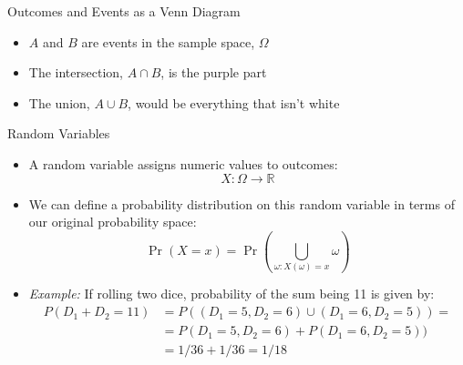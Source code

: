 \begin{frame}{Outcomes and Events as a Venn Diagram}


\def\firstcircle{(0,0) circle (1.5cm)}
\def\secondcircle{(0:2cm) circle (1.5cm)}

\begin{figure}
	\centering
{}
\end{figure}
\begin{itemize}
	\item $A$ and $B$ are events in the sample space, $\Omega$
	\item The intersection, $A\cap B$, is the purple part	
	\item The union, $A\cup B$, would be everything that isn't white
\end{itemize}


\end{frame}


\begin{frame}{Random Variables}
\begin{itemize}
	\item A random variable assigns numeric values to outcomes:\[
		X:\Omega \rightarrow \mathbb{R}
	\]

	\item We can define a probability distribution on this random variable in terms of our original probability space:	\[
				\Pr(X=x) = \Pr\left(\bigcup_{\omega:X(\omega)=x} \omega\right)
			\]
			
	\item \emph{Example:} If rolling two dice, probability of the sum being 11 is given by:
\begin{align*}	
P(D_1+D_2 = 11) &= P((D_1=5, D_2=6) \cup (D_1=6, D_2=5)) =\\
 &= P(D_1=5, D_2=6) + P(D_1=6, D_2=5)) \\
 &= 1/36 + 1/36 = 1/18
\end{align*}
\end{itemize}
\end{frame}

